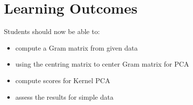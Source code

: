 \documentclass[12pt]{book}
\begin{document}
\section*{Learning Outcomes}
Students should now be able to:
\begin{itemize}
        \item compute a Gram matrix from given data
        \item using the centring matrix to center Gram matrix
                for PCA
        \item compute scores for Kernel PCA
        \item assess the results for simple data
\end{itemize}
\end{document}
